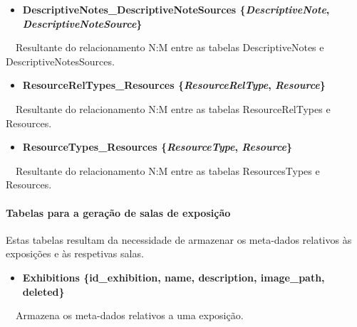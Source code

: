 \documentclass[letterpaper]{article}
\newcommand\liststyleLxv{%
\renewcommand\labelitemi{{\textbullet}}
\renewcommand\labelitemii{{\textbullet}}
\renewcommand\labelitemiii{{\textbullet}}
\renewcommand\labelitemiv{{\textbullet}}
}
\newcommand\liststyleLxvi{%
\renewcommand\labelitemi{{\textbullet}}
\renewcommand\labelitemii{{\textbullet}}
\renewcommand\labelitemiii{{\textbullet}}
\renewcommand\labelitemiv{{\textbullet}}
}
\begin{document}
\bigskip

\liststyleLxv
\begin{itemize}
\item {\bfseries
DescriptiveNotes\_DescriptiveNoteSources\textmd{
\{}\textmd{\textit{DescriptiveNote}}\textmd{,
}\textmd{\textit{DescriptiveNoteSource}}\textmd{\}}}
\end{itemize}
{
\ \ Resultante do relacionamento N:M entre as tabelas DescriptiveNotes e
DescriptiveNotesSources.}


\bigskip

\liststyleLxv
\begin{itemize}
\item {\bfseries
ResourceRelTypes\_Resources\textmd{
\{}\textmd{\textit{ResourceRelType}}\textmd{,
}\textmd{\textit{Resource}}\textmd{\}}}
\end{itemize}
{
\ \ Resultante do relacionamento N:M entre as tabelas ResourceRelTypes e
Resources.}


\bigskip

\liststyleLxv
\begin{itemize}
\item {\bfseries
ResourceTypes\_Resources\textmd{
\{}\textmd{\textit{ResourceType}}\textmd{,
}\textmd{\textit{Resource}}\textmd{\}}}
\end{itemize}
{
\ \ Resultante do relacionamento N:M entre as tabelas ResourcesTypes e
Resources.}


\bigskip


\bigskip

\paragraph[Tabelas para a gera\c{c}\~ao de salas de
exposi\c{c}\~ao]{ Tabelas para a gera\c{c}\~ao
de salas de exposi\c{c}\~ao}
{
Estas tabelas resultam da necessidade de armazenar os meta-dados
relativos \`as exposi\c{c}\~oes e \`as respetivas salas.}


\bigskip

\liststyleLxvi
\begin{itemize}
\item {\bfseries
Exhibitions\textmd{ \{}\textmd{id\_exhibition}\textmd{, name,
description, image\_path, deleted\}}}
\end{itemize}
{
\ \ Armazena os meta-dados relativos a uma exposi\c{c}\~ao.}
\end{document}
